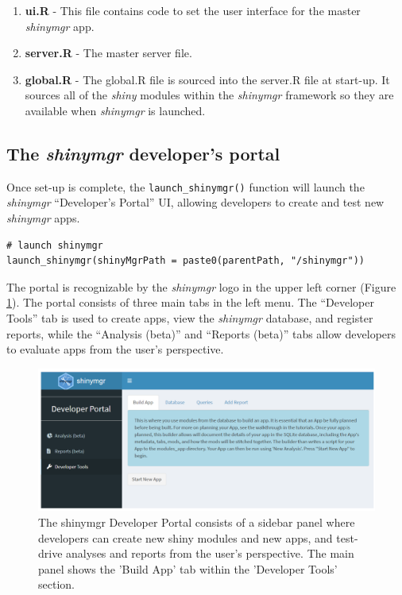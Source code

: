 \begin{itemize}
  \begin{enumerate}
  \def\labelenumi{\arabic{enumi}.}
  \tightlist
  \item
    \textbf{ui.R} - This file contains code to set the user interface for the master \emph{shinymgr} app.\\
  \item
    \textbf{server.R} - The master server file.\\
  \item
    \textbf{global.R} - The global.R file is sourced into the server.R file at start-up. It sources all of the \emph{shiny} modules within the \emph{shinymgr} framework so they are available when \emph{shinymgr} is launched.
  \end{enumerate}
\end{itemize}

\subsection{\texorpdfstring{The \emph{shinymgr} developer's portal}{The shinymgr developer's portal}}\label{the-shinymgr-developers-portal}

Once set-up is complete, the \texttt{launch\_shinymgr()} function will launch the \emph{shinymgr} ``Developer's Portal'' UI, allowing developers to create and test new \emph{shinymgr} apps.

\begin{verbatim}
# launch shinymgr
launch_shinymgr(shinyMgrPath = paste0(parentPath, "/shinymgr"))
\end{verbatim}

The portal is recognizable by the \emph{shinymgr} logo in the upper left corner (Figure \ref{fig:fig3}). The portal consists of three main tabs in the left menu. The ``Developer Tools'' tab is used to create apps, view the \emph{shinymgr} database, and register reports, while the ``Analysis (beta)'' and ``Reports (beta)'' tabs allow developers to evaluate apps from the user's perspective.

\begin{figure}
\includegraphics[width=1\linewidth]{images/figure3} \caption{The shinymgr Developer Portal consists of a sidebar panel where developers can create new shiny modules and new apps, and test-drive analyses and reports from the user's perspective. The main panel shows the 'Build App' tab within the 'Developer Tools' section.}\label{fig:fig3}
\end{figure}

